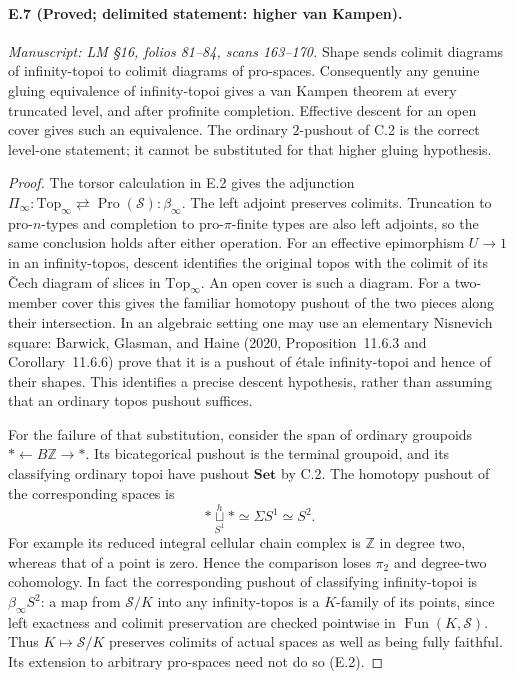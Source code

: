 \paragraph{E.7 (Proved; delimited statement: higher van Kampen).}
\textit{Manuscript: LM \S16, folios 81--84, scans 163--170.}
Shape sends colimit diagrams of infinity-topoi to colimit diagrams of pro-spaces. Consequently any genuine gluing equivalence of infinity-topoi gives a van Kampen theorem at every truncated level, and after profinite completion. Effective descent for an open cover gives such an equivalence. The ordinary $2$-pushout of C.2 is the correct level-one statement; it cannot be substituted for that higher gluing hypothesis.
\begin{proof}
The torsor calculation in E.2 gives the adjunction
$\Pi_\infty:\mathrm{Top}_\infty\rightleftarrows\operatorname{Pro}(\mathcal S):\beta_\infty$.
The left adjoint preserves colimits. Truncation to pro-$n$-types and completion to pro-$\pi$-finite types are also left adjoints, so the same conclusion holds after either operation. For an effective epimorphism $U\to1$ in an infinity-topos, descent identifies the original topos with the colimit of its \v Cech diagram of slices in $\mathrm{Top}_\infty$. An open cover is such a diagram. For a two-member cover this gives the familiar homotopy pushout of the two pieces along their intersection. In an algebraic setting one may use an elementary Nisnevich square: Barwick, Glasman, and Haine (2020, Proposition~11.6.3 and Corollary~11.6.6) prove that it is a pushout of étale infinity-topoi and hence of their shapes. This identifies a precise descent hypothesis, rather than assuming that an ordinary topos pushout suffices.

For the failure of that substitution, consider the span of ordinary groupoids
$*\leftarrow B\mathbb Z\to *$. Its bicategorical pushout is the terminal groupoid, and its classifying ordinary topoi have pushout $\mathbf{Set}$ by C.2. The homotopy pushout of the corresponding spaces is
\[
 *\mathop{\sqcup}\limits^{h}_{S^1}*\simeq\Sigma S^1\simeq S^2.
                                                        \tag{E.7.1}
\]
For example its reduced integral cellular chain complex is $\mathbb Z$ in degree two, whereas that of a point is zero. Hence the comparison loses $\pi_2$ and degree-two cohomology. In fact the corresponding pushout of classifying infinity-topoi is $\beta_\infty S^2$: a map from $\mathcal S/K$ into any infinity-topos is a $K$-family of its points, since left exactness and colimit preservation are checked pointwise in $\operatorname{Fun}(K,\mathcal S)$. Thus $K\mapsto\mathcal S/K$ preserves colimits of actual spaces as well as being fully faithful. Its extension to arbitrary pro-spaces need not do so (E.2).


\end{proof}
